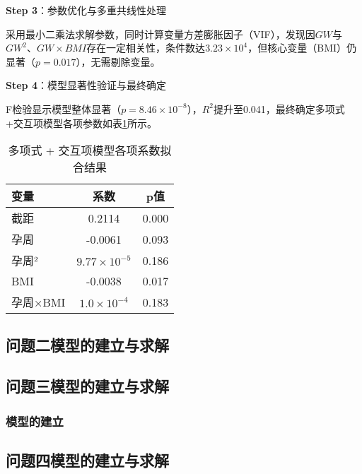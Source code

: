 \documentclass[withoutpreface,bwprint]{cumcmthesis} %
\begin{document}
\textbf{Step 3}：参数优化与多重共线性处理

  采用最小二乘法求解参数，同时计算变量方差膨胀因子（VIF），发现因$GW$与$GW^2$、$GW \times BMI$存在一定相关性，条件数达$3.23 \times 10^4$，但核心变量（BMI）仍显著（$p=0.017$），无需剔除变量。

\textbf{Step 4}：模型显著性验证与最终确定

  F检验显示模型整体显著（$p=8.46 \times 10^{-8}$），$R^2$提升至0.041，最终确定多项式+交互项模型各项参数如表\ref{tab:多项式 + 交互项模型各项系数拟合结果}所示。

\begin{table}[H]
    \centering  %
    \caption{多项式 + 交互项模型各项系数拟合结果}  %
    \label{tab:多项式 + 交互项模型各项系数拟合结果}  %
    \begin{threeparttable}
        \begin{tabularx}{0.4\textwidth}{l c c }
            \toprule[1.5pt]
            \textbf{变量} & \textbf{系数} & \textbf{p值}\\ 
            \midrule[1pt]
            截距 & 0.2114 & 0.000  \\
            孕周 & -0.0061 & 0.093  \\
            孕周² & $9.77 \times 10^{-5}$ & 0.186  \\
            BMI & -0.0038 & 0.017  \\
            孕周×BMI & $1.0 \times 10^{-4}$ & 0.183  \\

            \bottomrule[1.5pt]
        \end{tabularx}
    \end{threeparttable}
\end{table}


\subsection{问题二模型的建立与求解}

\subsection{问题三模型的建立与求解}
\subsubsection{模型的建立}


\subsection{问题四模型的建立与求解}
\end{document}

